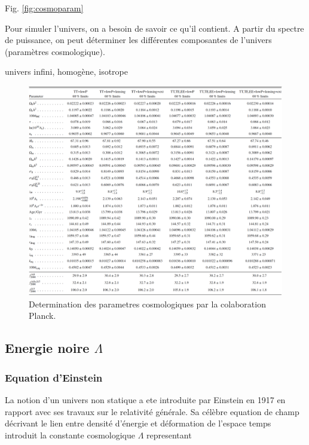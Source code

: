 Fig. \ref{fig:cosmoparam}


Pour simuler l'univers, on a besoin de savoir ce qu'il contient. 
A partir du spectre de puissance, on peut déterminer les différentes composantes de l'univers (paramètres cosmologique).

univers infini, homogène, isotrope




\begin{figure}[bth]
        \includegraphics[width=.95\linewidth]{img/01/table_planck.pdf} 
        \caption{Determination des parametres cosmologiques par la colaboration Planck.}
 		\label{fig:planck_parameters}
\end{figure}

\citep{planck_collaboration_planck_2016}

\subsection{Energie noire $\Lambda$}

\subsubsection{Equation d'Einstein}

La notion d'un univers non statique a ete introduite par Einstein en 1917 en rapport avec ses travaux sur le relativité générale. 
Sa célèbre equation de champ décrivant le lien entre densité d'énergie et déformation de l'espace temps introduit la constante cosmologique $\Lambda$ representant 

